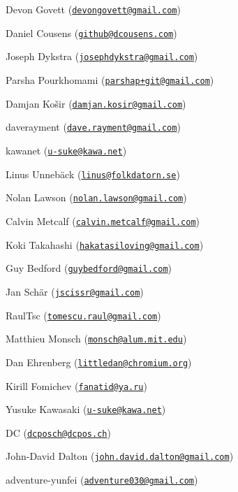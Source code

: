 \begin{DoxyItemize}
\item Devon Govett (\href{mailto:devongovett@gmail.com}{\tt devongovett@gmail.\+com})
\item Daniel Cousens (\href{mailto:github@dcousens.com}{\tt github@dcousens.\+com})
\item Joseph Dykstra (\href{mailto:josephdykstra@gmail.com}{\tt josephdykstra@gmail.\+com})
\item Parsha Pourkhomami (\href{mailto:parshap+git@gmail.com}{\tt parshap+git@gmail.\+com})
\item Damjan Košir (\href{mailto:damjan.kosir@gmail.com}{\tt damjan.\+kosir@gmail.\+com})
\item daverayment (\href{mailto:dave.rayment@gmail.com}{\tt dave.\+rayment@gmail.\+com})
\item kawanet (\href{mailto:u-suke@kawa.net}{\tt u-\/suke@kawa.\+net})
\item Linus Unnebäck (\href{mailto:linus@folkdatorn.se}{\tt linus@folkdatorn.\+se})
\item Nolan Lawson (\href{mailto:nolan.lawson@gmail.com}{\tt nolan.\+lawson@gmail.\+com})
\item Calvin Metcalf (\href{mailto:calvin.metcalf@gmail.com}{\tt calvin.\+metcalf@gmail.\+com})
\item Koki Takahashi (\href{mailto:hakatasiloving@gmail.com}{\tt hakatasiloving@gmail.\+com})
\item Guy Bedford (\href{mailto:guybedford@gmail.com}{\tt guybedford@gmail.\+com})
\item Jan Schär (\href{mailto:jscissr@gmail.com}{\tt jscissr@gmail.\+com})
\item Raul\+Tsc (\href{mailto:tomescu.raul@gmail.com}{\tt tomescu.\+raul@gmail.\+com})
\item Matthieu Monsch (\href{mailto:monsch@alum.mit.edu}{\tt monsch@alum.\+mit.\+edu})
\item Dan Ehrenberg (\href{mailto:littledan@chromium.org}{\tt littledan@chromium.\+org})
\item Kirill Fomichev (\href{mailto:fanatid@ya.ru}{\tt fanatid@ya.\+ru})
\item Yusuke Kawasaki (\href{mailto:u-suke@kawa.net}{\tt u-\/suke@kawa.\+net})
\item DC (\href{mailto:dcposch@dcpos.ch}{\tt dcposch@dcpos.\+ch})
\item John-\/\+David Dalton (\href{mailto:john.david.dalton@gmail.com}{\tt john.\+david.\+dalton@gmail.\+com})
\item adventure-\/yunfei (\href{mailto:adventure030@gmail.com}{\tt adventure030@gmail.\+com})

\end{DoxyItemize}
